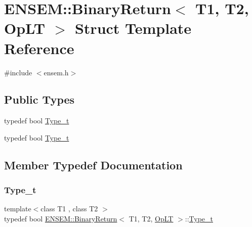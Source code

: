 \hypertarget{structENSEM_1_1BinaryReturn_3_01T1_00_01T2_00_01OpLT_01_4}{}\section{E\+N\+S\+EM\+:\+:Binary\+Return$<$ T1, T2, Op\+LT $>$ Struct Template Reference}
\label{structENSEM_1_1BinaryReturn_3_01T1_00_01T2_00_01OpLT_01_4}


{\ttfamily \#include $<$ensem.\+h$>$}

\subsection*{Public Types}
\begin{DoxyCompactItemize}
\item 
typedef bool \mbox{\hyperlink{structENSEM_1_1BinaryReturn_3_01T1_00_01T2_00_01OpLT_01_4_a5617c2e3cf4124ac0b4d777ae1a195ec}{Type\+\_\+t}}
\item 
typedef bool \mbox{\hyperlink{structENSEM_1_1BinaryReturn_3_01T1_00_01T2_00_01OpLT_01_4_a5617c2e3cf4124ac0b4d777ae1a195ec}{Type\+\_\+t}}
\end{DoxyCompactItemize}


\subsection{Member Typedef Documentation}
\mbox{\label{structENSEM_1_1BinaryReturn_3_01T1_00_01T2_00_01OpLT_01_4_a5617c2e3cf4124ac0b4d777ae1a195ec}} 
\subsubsection{\texorpdfstring{Type\_t}{Type\_t}\hspace{0.1cm}{\footnotesize\ttfamily [1/2]}}
{\footnotesize\ttfamily template$<$class T1 , class T2 $>$ \\
typedef bool \mbox{\hyperlink{structENSEM_1_1BinaryReturn}{E\+N\+S\+E\+M\+::\+Binary\+Return}}$<$ T1, T2, \mbox{\hyperlink{structENSEM_1_1OpLT}{Op\+LT}} $>$\+::\mbox{\hyperlink{structENSEM_1_1BinaryReturn_3_01T1_00_01T2_00_01OpLT_01_4_a5617c2e3cf4124ac0b4d777ae1a195ec}{Type\+\_\+t}}}

